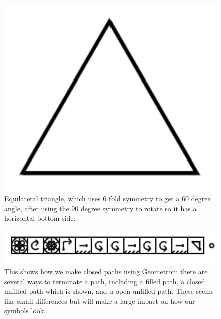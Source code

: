 \documentclass[11pt]{book}
\begin{document}
\begin{figure}

\includegraphics[width=\linewidth]{../figures/triangle1.png}

\caption{Equilateral triangle, which uses 6 fold symmetry to get a 60 degree angle, after using the 90 degree symmetry to rotate so it has a horizontal bottom side.}
\end{figure}


\begin{figure}

\includegraphics[width=\linewidth]{../figures/spelltriangle1.png}

\caption{This shows how we make closed paths using Geometron: there are several ways to terminate a path, including a filled path, a closed unfilled path which is shown, and a open unfilled path.  These seems like small differences but will make a large impact on how our symbols look.}
\end{figure}
\end{document}
